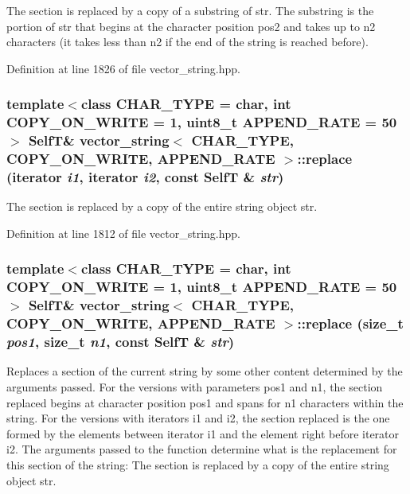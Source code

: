 The section is replaced by a copy of a substring of str. The substring is the portion of str that begins at the character position pos2 and takes up to n2 characters (it takes less than n2 if the end of the string is reached before). 

Definition at line 1826 of file vector\_\-string.hpp.\hypertarget{classvector__string_f5d63c2c0b023d1719ef9cd0a94e4e7d}{
\subsubsection[{replace}]{\setlength{\rightskip}{0pt plus 5cm}template$<$class CHAR\_\-TYPE  = char, int COPY\_\-ON\_\-WRITE = 1, uint8\_\-t APPEND\_\-RATE = 50$>$ {\bf SelfT}\& {\bf vector\_\-string}$<$ CHAR\_\-TYPE, COPY\_\-ON\_\-WRITE, APPEND\_\-RATE $>$::replace (iterator {\em i1}, \/  iterator {\em i2}, \/  const {\bf SelfT} \& {\em str})}}
\label{classvector__string_f5d63c2c0b023d1719ef9cd0a94e4e7d}


The section is replaced by a copy of the entire string object str. 

Definition at line 1812 of file vector\_\-string.hpp.\hypertarget{classvector__string_9ee659752a1293cc78baf7212aa25ed8}{
\subsubsection[{replace}]{\setlength{\rightskip}{0pt plus 5cm}template$<$class CHAR\_\-TYPE  = char, int COPY\_\-ON\_\-WRITE = 1, uint8\_\-t APPEND\_\-RATE = 50$>$ {\bf SelfT}\& {\bf vector\_\-string}$<$ CHAR\_\-TYPE, COPY\_\-ON\_\-WRITE, APPEND\_\-RATE $>$::replace (size\_\-t {\em pos1}, \/  size\_\-t {\em n1}, \/  const {\bf SelfT} \& {\em str})}}
\label{classvector__string_9ee659752a1293cc78baf7212aa25ed8}


Replaces a section of the current string by some other content determined by the arguments passed. For the versions with parameters pos1 and n1, the section replaced begins at character position pos1 and spans for n1 characters within the string. For the versions with iterators i1 and i2, the section replaced is the one formed by the elements between iterator i1 and the element right before iterator i2. The arguments passed to the function determine what is the replacement for this section of the string: The section is replaced by a copy of the entire string object str. 

